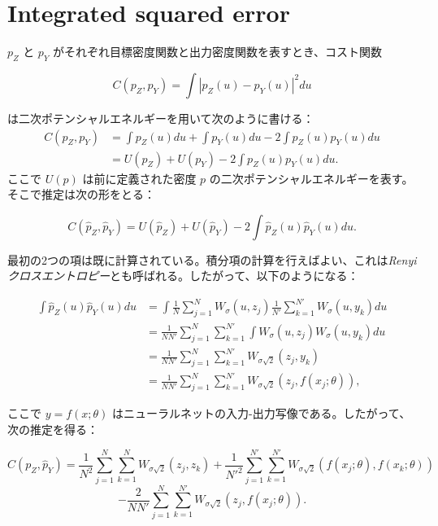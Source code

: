 \documentclass[dvipdfmx,a4paper]{jsarticle}%
\begin{document}
\section{\textbf{Integrated squared error}}
\begin{dfn}\label{def:ise}
   $p_Z$ と $p_Y$ がそれぞれ目標密度関数と出力密度関数を表すとき、コスト関数

$$C(p_Z, p_Y) = \int |p_Z(u) - p_Y(u)|^2 du$$

は二次ポテンシャルエネルギーを用いて次のように書ける：
\begin{align*}
C(p_Z, p_Y) &= \int p_Z(u) du + \int p_Y(u) du - 2 \int p_Z(u)p_Y(u) du\\
&= U(p_Z) + U(p_Y) - 2 \int p_Z(u)p_Y(u) du.
\end{align*}
ここで $U(p)$ は前に定義された密度 $p$ の二次ポテンシャルエネルギーを表す。そこで推定は次の形をとる：

$$C(\hat{p}_Z, \hat{p}_Y) = U(\hat{p}_Z) + U(\hat{p}_Y) - 2 \int \hat{p}_Z(u)\hat{p}_Y(u) du.$$

\noindent
最初の2つの項は既に計算されている。積分項の計算を行えばよい、これは\textit{Renyiクロスエントロピー}とも呼ばれる。したがって、以下のようになる：

\begin{align*}
\int \hat{p}_Z(u)\hat{p}_Y(u) du &= \int \frac{1}{N} \sum_{j=1}^N W_\sigma(u, z_j) \frac{1}{N'} \sum_{k=1}^{N'} W_\sigma(u, y_k) du \\
&= \frac{1}{NN'} \sum_{j=1}^N \sum_{k=1}^{N'} \int W_\sigma(u, z_j)W_\sigma(u, y_k) du \\
&= \frac{1}{NN'} \sum_{j=1}^N \sum_{k=1}^{N'} W_{\sigma\sqrt{2}}(z_j, y_k) \\
&= \frac{1}{NN'} \sum_{j=1}^N \sum_{k=1}^{N'} W_{\sigma\sqrt{2}}(z_j, f(x_j; \theta)),
\end{align*}

ここで $y = f(x; \theta)$ はニューラルネットの入力-出力写像である。したがって、次の推定を得る：

$$C(p_Z, \hat{p}_Y) = \frac{1}{N^2} \sum_{j=1}^N \sum_{k=1}^N W_{\sigma\sqrt{2}}(z_j, z_k) + \frac{1}{N'^2} \sum_{j=1}^{N'} \sum_{k=1}^{N'} W_{\sigma\sqrt{2}}(f(x_j; \theta), f(x_k; \theta))$$
$$- \frac{2}{NN'} \sum_{j=1}^N \sum_{k=1}^{N'} W_{\sigma\sqrt{2}}(z_j, f(x_j; \theta)).$$
\end{dfn}
\end{document}
